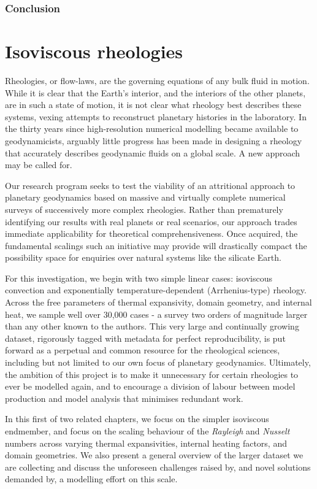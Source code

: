 \documentclass[a4paper,11pt,oneside]{book}
\renewcommand{\section}[1]{\chapter{#1}}
\begin{document}
\subsection{Conclusion}

\section{Isoviscous rheologies}

Rheologies, or flow-laws, are the governing equations of any bulk fluid in motion. While it is clear that the Earth's interior, and the interiors of the other planets, are in such a state of motion, it is not clear what rheology best describes these systems, vexing attempts to reconstruct planetary histories in the laboratory. In the thirty years since high-resolution numerical modelling became available to geodynamicists, arguably little progress has been made in designing a rheology that accurately describes geodynamic fluids on a global scale. A new approach may be called for.

Our research program seeks to test the viability of an attritional approach to planetary geodynamics based on massive and virtually complete numerical surveys of successively more complex rheologies. Rather than prematurely identifying our results with real planets or real scenarios, our approach trades immediate applicability for theoretical comprehensiveness. Once acquired, the fundamental scalings such an initiative may provide will drastically compact the possibility space for enquiries over natural systems like the silicate Earth.

For this investigation, we begin with two simple linear cases: isoviscous convection and exponentially temperature-dependent (Arrhenius-type) rheology. Across the free parameters of thermal expansivity, domain geometry, and internal heat, we sample well over 30,000 cases - a survey two orders of magnitude larger than any other known to the authors. This very large and continually growing dataset, rigorously tagged with metadata for perfect reproducibility, is put forward as a perpetual and common resource for the rheological sciences, including but not limited to our own focus of planetary geodynamics. Ultimately, the ambition of this project is to make it unnecessary for certain rheologies to ever be modelled again, and to encourage a division of labour between model production and model analysis that minimises redundant work.

In this first of two related chapters, we focus on the simpler isoviscous endmember, and focus on the scaling behaviour of the \textit{Rayleigh} and \textit{Nusselt} numbers across varying thermal expansivities, internal heating factors, and domain geometries. We also present a general overview of the larger dataset we are collecting and discuss the unforeseen challenges raised by, and novel solutions demanded by, a modelling effort on this scale.
\end{document}
